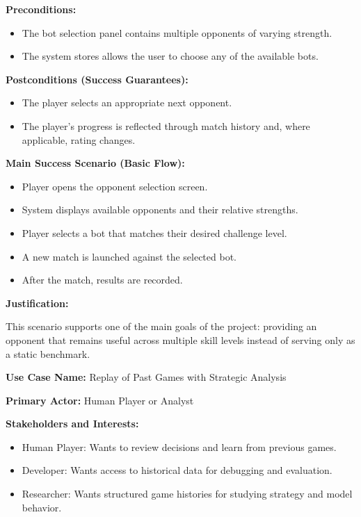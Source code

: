\documentclass{article}
\begin{document}
\noindent\textbf{Preconditions:}
\begin{itemize}
    \item The bot selection panel contains multiple opponents of varying strength.
    \item The system stores allows the user to choose any of the available bots.
\end{itemize}

\noindent\textbf{Postconditions (Success Guarantees):}
\begin{itemize}
    \item The player selects an appropriate next opponent.
    \item The player's progress is reflected through match history and, where applicable, rating changes.
\end{itemize}

\noindent\textbf{Main Success Scenario (Basic Flow):}
\begin{itemize}
    \item Player opens the opponent selection screen.
    \item System displays available opponents and their relative strengths.
    \item Player selects a bot that matches their desired challenge level.
    \item A new match is launched against the selected bot.
    \item After the match, results are recorded.
\end{itemize}

\noindent\textbf{Justification:}

This scenario supports one of the main goals of the project: providing an \AI{} opponent that remains useful across multiple skill levels instead of serving only as a static benchmark.

\vspace{1em}

\noindent\textbf{Use Case Name:} Replay of Past Games with Strategic Analysis

\noindent\textbf{Primary Actor:} Human Player or Analyst

\noindent\textbf{Stakeholders and Interests:}
\begin{itemize}
    \item Human Player: Wants to review decisions and learn from previous games.
    \item Developer: Wants access to historical data for debugging and evaluation.
    \item Researcher: Wants structured game histories for studying strategy and model behavior.
\end{itemize}
\end{document}
